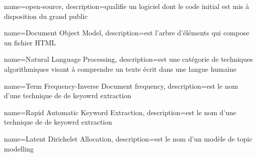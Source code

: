 \makeglossaries

{
	name=open-source,
	description={qualifie un logiciel dont le code initial est mis à disposition du grand public}
}

{
	name={Document Object Model},
	description={est l'arbre d'éléments qui compose un fichier HTML}
}

{
	name={Natural Language Processing},
	description={est une catégorie de techniques algorithmiques visant à comprendre un texte écrit dans une langue humaine}
}

{
	name={Term Frequency-Inverse Document frequency},
	description={est le nom d'une technique de de keyowrd extraction}
}

{
	name={Rapid Automatic Keyword Extraction},
	description={est le nom d'une technique de de keyowrd extraction}
}

{
	name={Latent Dirichelet Allocation},
	description={est le nom d'un modèle de topic modelling}
}